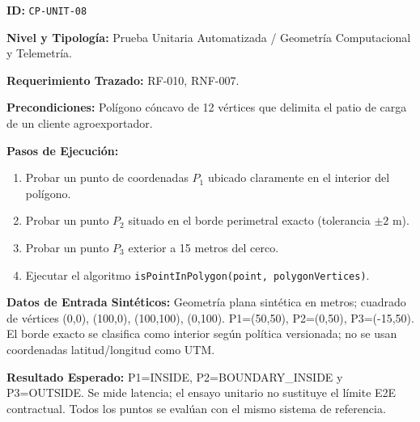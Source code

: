 \par\noindent\textbf{ID:} \texttt{C\allowbreak{}P\allowbreak{}-\allowbreak{}U\allowbreak{}N\allowbreak{}I\allowbreak{}T\allowbreak{}-\allowbreak{}0\allowbreak{}8\allowbreak{}}\par
\par\noindent\textbf{Nivel y Tipología:} Prueba Unitaria Automatizada / Geometría Computacional y Telemetría.\par
\par\noindent\textbf{Requerimiento Trazado:} RF-010, RNF-007.\par
\par\noindent\textbf{Precondiciones:} Polígono cóncavo de 12 vértices que delimita el patio de carga de un cliente agroexportador.\par
\par\noindent\textbf{Pasos de Ejecución:} \par
\begin{enumerate}
\item Probar un punto de coordenadas \(P_1\) ubicado claramente en el interior del polígono.
\item Probar un punto \(P_2\) situado en el borde perimetral exacto (tolerancia \(\pm 2\text{ m}\)).
\item Probar un punto \(P_3\) exterior a 15 metros del cerco.
\item Ejecutar el algoritmo \texttt{i\allowbreak{}s\allowbreak{}P\allowbreak{}o\allowbreak{}i\allowbreak{}n\allowbreak{}t\allowbreak{}I\allowbreak{}n\allowbreak{}P\allowbreak{}o\allowbreak{}l\allowbreak{}y\allowbreak{}g\allowbreak{}o\allowbreak{}n\allowbreak{}(\allowbreak{}p\allowbreak{}o\allowbreak{}i\allowbreak{}n\allowbreak{}t\allowbreak{},\allowbreak{} p\allowbreak{}o\allowbreak{}l\allowbreak{}y\allowbreak{}g\allowbreak{}o\allowbreak{}n\allowbreak{}V\allowbreak{}e\allowbreak{}r\allowbreak{}t\allowbreak{}i\allowbreak{}c\allowbreak{}e\allowbreak{}s\allowbreak{})\allowbreak{}}.
\end{enumerate}
\par\noindent\textbf{Datos de Entrada Sintéticos:} Geometría plana sintética en metros; cuadrado de vértices (0,0), (100,0), (100,100), (0,100). P1=(50,50), P2=(0,50), P3=(-15,50). El borde exacto se clasifica como interior según política versionada; no se usan coordenadas latitud/longitud como UTM.\par
\par\noindent\textbf{Resultado Esperado:} P1=INSIDE, P2=BOUNDARY\_INSIDE y P3=OUTSIDE. Se mide latencia; el ensayo unitario no sustituye el límite E2E contractual. Todos los puntos se evalúan con el mismo sistema de referencia.\par

